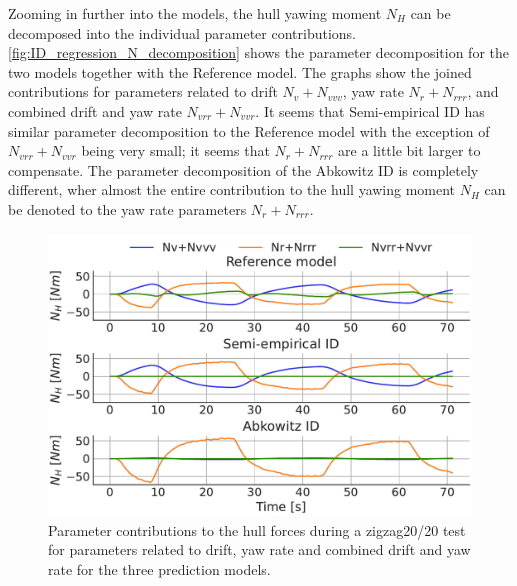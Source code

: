 Zooming in further into the models, the hull yawing moment $N_H$ can be decomposed into the individual parameter contributions. \autoref{fig:ID_regression_N_decomposition} shows the parameter decomposition for the two models together with the Reference model. The graphs show the joined contributions for parameters related to drift $N_v+N_{vvv}$, yaw rate $N_r+N_{rrr}$, and combined drift and yaw rate $N_{vrr}+N_{vvr}$. It seems that Semi-empirical ID has similar parameter decomposition to the Reference model with the exception of $N_{vrr}+N_{vvr}$ being very small; it seems that $N_r+N_{rrr}$ are a little bit larger to compensate.
The parameter decomposition of the Abkowitz ID is completely different, wher almost the entire contribution to the hull yawing moment $N_H$ can be denoted to the yaw rate parameters $N_r+N_{rrr}$. 
\begin{figure}[h!]
    \begin{center}
        \includegraphics[width=\columnwidth]{figures/result_ID_regression.ID_regression_N_decomposition.pdf}
        \caption{Parameter contributions to the hull forces during a zigzag20/20 test for parameters related to drift, yaw rate and combined drift and yaw rate for the three prediction models.}
        \label{fig:ID_regression_N_decomposition}
    \end{center}
\end{figure}
